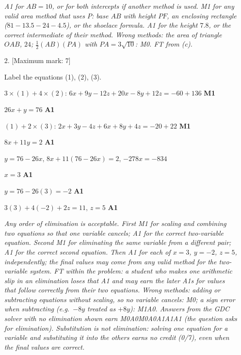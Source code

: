 \documentclass[12pt, twoside]{article}
\begin{document}
\begin{enumerate}[itemsep=0.3cm]
\emph{A1 for $AB = 10$, or for both intercepts if another method is used.
M1 for any valid area method that uses $P$: base $AB$ with height $PF$, an
enclosing rectangle ($81 - 13.5 - 24 - 4.5$), or the shoelace formula. A1
for the height $7.8$, or the correct intermediate of their method. Wrong
methods: the area of triangle $OAB$, $24$; $\frac{1}{2}(AB)(PA)$ with
$PA = 3\sqrt{10}$: M0. FT from (c).}

\newpage

\item[2.] [Maximum mark: 7]

Label the equations (1), (2), (3).

$3 \times (1) + 4 \times (2)$: \quad $6x + 9y - 12z + 20x - 8y + 12z = -60 + 136$ \hfill \textbf{M1}

$26x + y = 76$ \hfill \textbf{A1}

$(1) + 2 \times (3)$: \quad $2x + 3y - 4z + 6x + 8y + 4z = -20 + 22$ \hfill \textbf{M1}

$8x + 11y = 2$ \hfill \textbf{A1}

$y = 76 - 26x$, \quad $8x + 11(76 - 26x) = 2$, \quad $-278x = -834$

$x = 3$ \hfill \textbf{A1}

$y = 76 - 26(3) = -2$ \hfill \textbf{A1}

$3(3) + 4(-2) + 2z = 11$, \quad $z = 5$ \hfill \textbf{A1}

\emph{Any order of elimination is acceptable. First M1 for scaling and
combining two equations so that one variable cancels; A1 for the correct
two-variable equation. Second M1 for eliminating the same variable from a
different pair; A1 for the correct second equation. Then A1 for each of
$x = 3$, $y = -2$, $z = 5$, independently; the final values may come from
any valid method for the two-variable system. FT within the problem: a
student who makes one arithmetic slip in an elimination loses that A1 and
may earn the later A1s for values that follow correctly from their two
equations. Wrong methods: adding or subtracting equations without scaling,
so no variable cancels: M0; a sign error when subtracting (e.g.\ $-8y$
treated as $+8y$): M1A0. Answers from the GDC solver with no elimination
shown earn M0A0M0A0A1A1A1 (the question asks for elimination).
Substitution is not elimination: solving one equation for a variable and
substituting it into the others earns no credit (0/7), even when the final
values are correct.}


\end{enumerate}
\end{document}

